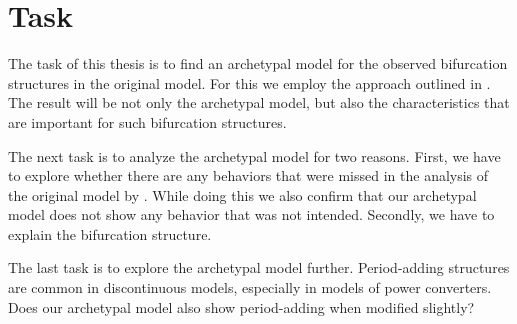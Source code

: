 \chapter{Task}
\label{chap:task}

The task of this thesis is to find an archetypal model for the observed bifurcation structures in the original model.
For this we employ the approach outlined in .
The result will be not only the archetypal model, but also the characteristics that are important for such bifurcation structures.

The next task is to analyze the archetypal model for two reasons.
First, we have to explore whether there are any behaviors that were missed in the analysis of the original model by .
While doing this we also confirm that our archetypal model does not show any behavior that was not intended.
Secondly, we have to explain the bifurcation structure.

The last task is to explore the archetypal model further.
Period-adding structures are common in discontinuous models, especially in models of power converters.
Does our archetypal model also show period-adding when modified slightly?
